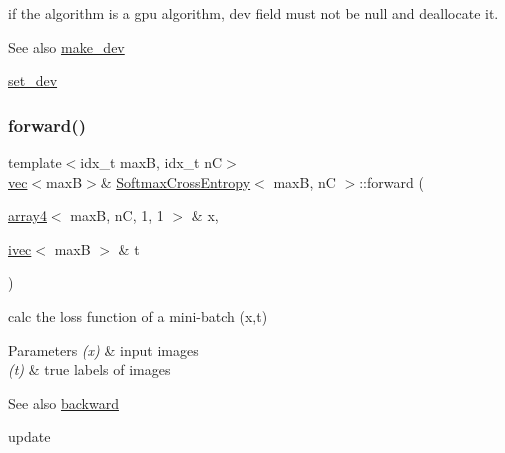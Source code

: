 if the algorithm is a gpu algorithm, dev field must not be null and deallocate it. 

\begin{DoxySeeAlso}{See also}
\hyperlink{structSoftmaxCrossEntropy_ae02a6267c117629143f37216cad345a0}{make\+\_\+dev} 

\hyperlink{structSoftmaxCrossEntropy_a2fd71f3001bb7a06f4f4c2902c43b657}{set\+\_\+dev} 
\end{DoxySeeAlso}
\mbox{\label{structSoftmaxCrossEntropy_ad9123a2a40bac45237466faf0cff3fbc}} 
\subsubsection{\texorpdfstring{forward()}{forward()}}
{\footnotesize\ttfamily template$<$idx\+\_\+t maxB, idx\+\_\+t nC$>$ \\
\hyperlink{structvec}{vec}$<$maxB$>$\& \hyperlink{structSoftmaxCrossEntropy}{Softmax\+Cross\+Entropy}$<$ maxB, nC $>$\+::forward (\begin{DoxyParamCaption}\item[{\hyperlink{structarray4}{array4}$<$ maxB, nC, 1, 1 $>$ \&}]{x,  }\item[{\hyperlink{structivec}{ivec}$<$ maxB $>$ \&}]{t }\end{DoxyParamCaption})\hspace{0.3cm}{\ttfamily [inline]}}



calc the loss function of a mini-\/batch (x,t) 


\begin{DoxyParams}{Parameters}
{\em (x)} & input images \\
\hline
{\em (t)} & true labels of images \\
\hline
\end{DoxyParams}
\begin{DoxySeeAlso}{See also}
\hyperlink{structSoftmaxCrossEntropy_afb506c6159bd6cd02a6c5e8426628fe0}{backward} 

update 
\end{DoxySeeAlso}
\mbox{\label{structSoftmaxCrossEntropy_a8a478a94bbd9fd17e08fe86cb758d90f}} 
